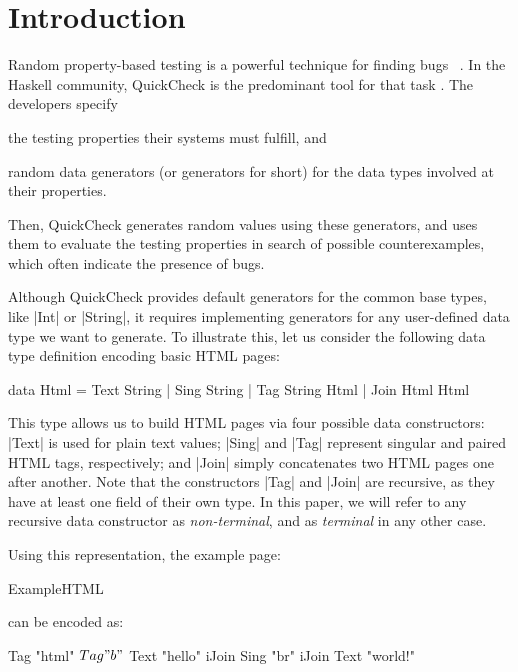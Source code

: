 \section{Introduction}
\label{sec:intro}

%
Random property-based testing is a powerful technique for finding bugs
~\cite{ArtsHNS15, HughesPAN16, HughesNSA16, MidtgaardJKNN17}.
%
In the Haskell community, QuickCheck is the predominant tool for that task
\cite{ClaessenH00}.
%
The developers specify
%
\begin{inparaenum}[(i)]
\item the testing properties their systems must fulfill, and
\item random data generators (or generators for short) for the data types
  involved at their properties.
\end{inparaenum}
%
Then, QuickCheck generates random values using these generators, and uses them
to evaluate the testing properties in search of possible counterexamples, which
often indicate the presence of bugs.


%
Although QuickCheck provides default generators for the common base types, like
|Int| or |String|, it requires implementing generators for any user-defined data
type we want to generate.
%
%
To illustrate this, let us consider the following data type definition encoding
basic HTML pages:

\begin{code}
data Html  =  Text  String
           |  Sing  String
           |  Tag   String Html
           |  Join  Html Html
\end{code}
%
This type allows us to build HTML pages via four possible data constructors:
|Text| is used for plain text values; |Sing| and |Tag| represent singular and
paired HTML tags, respectively; and |Join| simply concatenates two HTML pages
one after another.
%
Note that the constructors |Tag| and |Join| are recursive, as they have at least
one field of their own type.
%
In this paper, we will refer to any recursive data constructor as
\emph{non-terminal}, and as \emph{terminal} in any other case.


Using this representation, the example page:

\begin{code}
ExampleHTML
\end{code}
%
can be encoded as:
%
\begin{code}
Tag "html" $ Tag "b" $
  Text "hello" iJoin Sing "br" iJoin Text "world!"
\end{code} %

